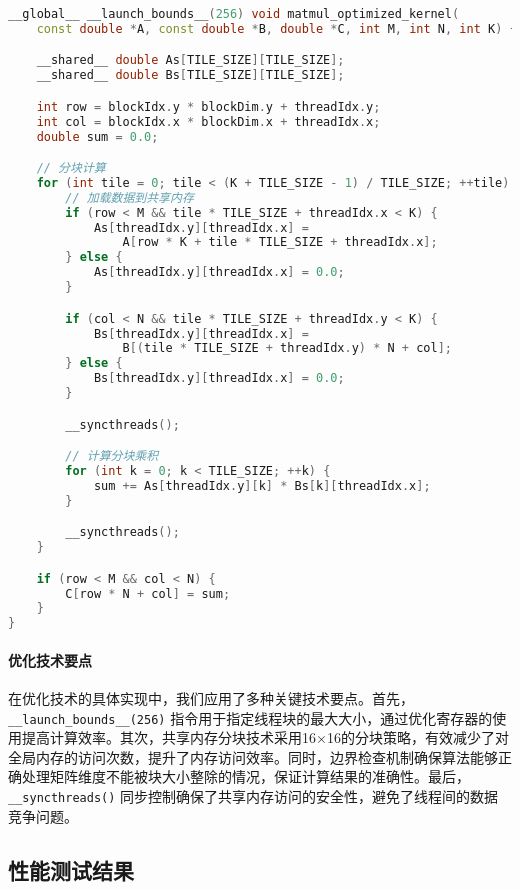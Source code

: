 \documentclass[a4paper]{article}
\begin{document}
\begin{lstlisting}[language=C++]
__global__ __launch_bounds__(256) void matmul_optimized_kernel(
    const double *A, const double *B, double *C, int M, int N, int K) {

    __shared__ double As[TILE_SIZE][TILE_SIZE];
    __shared__ double Bs[TILE_SIZE][TILE_SIZE];

    int row = blockIdx.y * blockDim.y + threadIdx.y;
    int col = blockIdx.x * blockDim.x + threadIdx.x;
    double sum = 0.0;

    // 分块计算
    for (int tile = 0; tile < (K + TILE_SIZE - 1) / TILE_SIZE; ++tile) {
        // 加载数据到共享内存
        if (row < M && tile * TILE_SIZE + threadIdx.x < K) {
            As[threadIdx.y][threadIdx.x] = 
                A[row * K + tile * TILE_SIZE + threadIdx.x];
        } else {
            As[threadIdx.y][threadIdx.x] = 0.0;
        }

        if (col < N && tile * TILE_SIZE + threadIdx.y < K) {
            Bs[threadIdx.y][threadIdx.x] = 
                B[(tile * TILE_SIZE + threadIdx.y) * N + col];
        } else {
            Bs[threadIdx.y][threadIdx.x] = 0.0;
        }

        __syncthreads();

        // 计算分块乘积
        for (int k = 0; k < TILE_SIZE; ++k) {
            sum += As[threadIdx.y][k] * Bs[k][threadIdx.x];
        }

        __syncthreads();
    }

    if (row < M && col < N) {
        C[row * N + col] = sum;
    }
}
\end{lstlisting}

\paragraph{优化技术要点}

在优化技术的具体实现中，我们应用了多种关键技术要点。首先，\texttt{\_\_launch\_bounds\_\_(256)} 指令用于指定线程块的最大大小，通过优化寄存器的使用提高计算效率。其次，共享内存分块技术采用16×16的分块策略，有效减少了对全局内存的访问次数，提升了内存访问效率。同时，边界检查机制确保算法能够正确处理矩阵维度不能被块大小整除的情况，保证计算结果的准确性。最后，\texttt{\_\_syncthreads()} 同步控制确保了共享内存访问的安全性，避免了线程间的数据竞争问题。

\subsection{性能测试结果}
\end{document}
